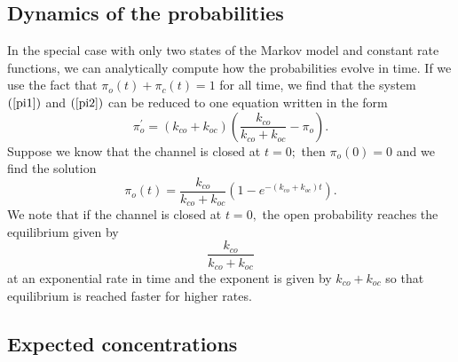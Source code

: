 

\subsection{Dynamics of the probabilities}

In the special case with only two states of the Markov model and constant
rate functions, we can analytically compute how the probabilities evolve in
time. If we use the fact that $\pi_{o}\left(  t\right)  +\pi_{c}\left(
t\right)  =1$ for all time, we find that the system $\left(  \ref{pi1}\right)$
and $\left(\ref{pi2}\right)  $ can be reduced to one equation written in the form%
\begin{equation}
\pi_{o}^{\prime}=\left(  k_{co}+k_{oc}\right)  \left(  \frac{k_{co}}%
{k_{co}+k_{oc}}-\pi_{o}\right)  . \label{pi_o}
\end{equation}
Suppose we know that the channel is closed at $t=0;$ then $\pi_{o}(0)=0$ and
we find the solution%
\begin{equation}
\pi_{o}(t)=\frac{k_{co}}{k_{co}+k_{oc}}\left(  1-e^{-\left(  k_{co}%
+k_{oc}\right)  t}\right)  .\label{pio11}%
\end{equation}
We note that if the channel is closed at $t=0,$ the open probability reaches
the equilibrium given by 
\[ \frac{k_{co}}{k_{co}+k_{oc}}\]
at an exponential rate in
time and the exponent is given by $ k_{co}+k_{oc}$ so
that equilibrium is reached faster for higher rates.


\subsection{Expected concentrations}

